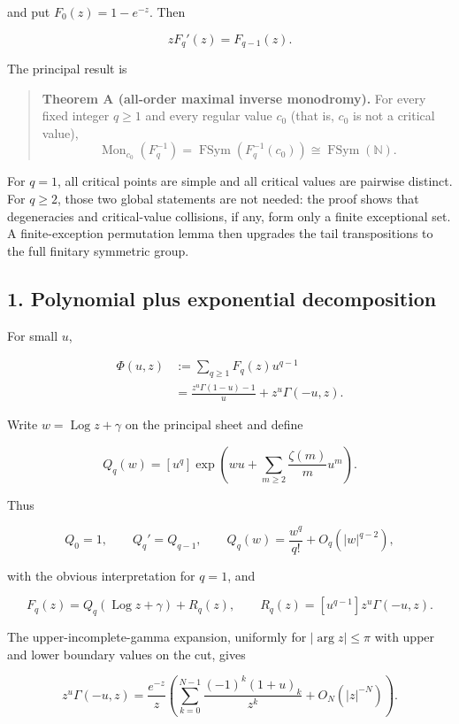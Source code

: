 \documentclass[11pt]{article}
\DeclareMathOperator{\Log}{Log}
\theoremstyle{keio}
\theoremstyle{definition}
\theoremstyle{remark}
\begin{document}
and put \(F_0(z)=1-e^{-z}\). Then

\[
 zF_q'(z)=F_{q-1}(z).
\tag{Inv-0.1}
\]

The principal result is

\begin{quote}
\textbf{Theorem A (all-order maximal inverse monodromy).} For every fixed
integer \(q\geq1\) and every regular value \(c_0\) (that is, \(c_0\) is
not a critical value),
\[
 \operatorname{Mon}_{c_0}(F_q^{-1})
 =\operatorname{FSym}(F_q^{-1}(c_0))
 \cong\operatorname{FSym}(\mathbb N).
\tag{Inv-0.2}
\]
\end{quote}

For \(q=1\), all critical points are simple and all critical values are
pairwise distinct. For \(q\geq2\), those two global statements are not
needed: the proof shows that degeneracies and critical-value collisions, if
any, form only a finite exceptional set. A finite-exception permutation
lemma then upgrades the tail transpositions to the full finitary symmetric
group.

\subsection{1. Polynomial plus exponential decomposition}

For small \(u\),

\[
 \begin{aligned}
 \Phi(u,z)
 &:=\sum_{q\geq1}F_q(z)u^{q-1}\\
 &=\frac{z^u\Gamma(1-u)-1}{u}+z^u\Gamma(-u,z).
 \end{aligned}
\tag{Inv-1.1}
\]

Write \(w=\Log z+\gamma\) on the principal sheet and define

\[
 Q_q(w)=[u^q]\exp\!\left(
 wu+\sum_{m\geq2}\frac{\zeta(m)}m u^m\right).
\tag{Inv-1.2}
\]

Thus

\[
 Q_0=1,\qquad Q_q'=Q_{q-1},\qquad
 Q_q(w)=\frac{w^q}{q!}+O_q(|w|^{q-2}),
\tag{Inv-1.3}
\]

with the obvious interpretation for \(q=1\), and

\[
 F_q(z)=Q_q(\Log z+\gamma)+R_q(z),\qquad
 R_q(z)=[u^{q-1}]z^u\Gamma(-u,z).
\tag{Inv-1.4}
\]

The upper-incomplete-gamma expansion, uniformly for \(|\arg z|\leq\pi\)
with upper and lower boundary values on the cut, gives

\[
 z^u\Gamma(-u,z)
 =\frac{e^{-z}}z\left(
 \sum_{k=0}^{N-1}\frac{(-1)^k(1+u)_k}{z^k}
 +O_N(|z|^{-N})\right).
\tag{Inv-1.5}
\]
\end{document}
